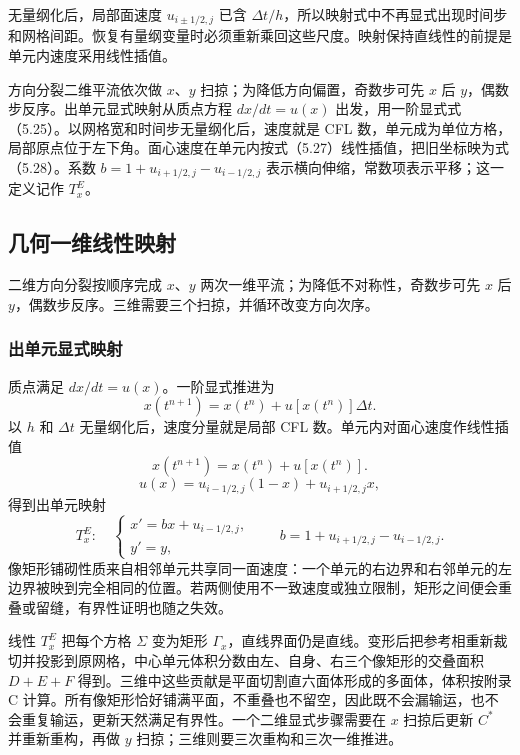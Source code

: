 \documentclass[11pt,a4paper,openany,fontset=none]{ctexbook}
\begin{document}
无量纲化后，局部面速度 $u_{i\pm1/2,j}$ 已含 $\Delta t/h$，所以映射式中不再显式出现时间步和网格间距。恢复有量纲变量时必须重新乘回这些尺度。映射保持直线性的前提是单元内速度采用线性插值。

方向分裂二维平流依次做 $x$、$y$ 扫掠；为降低方向偏置，奇数步可先 $x$ 后 $y$，偶数步反序。出单元显式映射从质点方程 $dx/dt=u(x)$ 出发，用一阶显式式（5.25）。以网格宽和时间步无量纲化后，速度就是 CFL 数，单元成为单位方格，局部原点位于左下角。面心速度在单元内按式（5.27）线性插值，把旧坐标映为式（5.28）。系数 $b=1+u_{i+1/2,j}-u_{i-1/2,j}$ 表示横向伸缩，常数项表示平移；这一定义记作 $T_x^E$。

\subsection{几何一维线性映射}

二维方向分裂按顺序完成 $x$、$y$ 两次一维平流；为降低不对称性，奇数步可先 $x$ 后 $y$，偶数步反序。三维需要三个扫掠，并循环改变方向次序。

\subsubsection{出单元显式映射}

质点满足 $dx/dt=u(x)$。一阶显式推进为
\begin{equation}
x(t^{n+1})=x(t^n)+u[x(t^n)]\Delta t.
\tag{5.25}
\end{equation}
以 $h$ 和 $\Delta t$ 无量纲化后，速度分量就是局部 CFL 数。单元内对面心速度作线性插值
\begin{equation}
x(t^{n+1})=x(t^n)+u[x(t^n)].
\tag{5.26}
\end{equation}
\begin{equation}
u(x)=u_{i-1/2,j}(1-x)+u_{i+1/2,j}x,
\tag{5.27}
\end{equation}
得到出单元映射
\begin{equation}
T_x^E:\quad
\begin{cases}
x'=bx+u_{i-1/2,j},\\
y'=y,
\end{cases}
\qquad b=1+u_{i+1/2,j}-u_{i-1/2,j}.
\tag{5.28}
\end{equation}
像矩形铺砌性质来自相邻单元共享同一面速度：一个单元的右边界和右邻单元的左边界被映到完全相同的位置。若两侧使用不一致速度或独立限制，矩形之间便会重叠或留缝，有界性证明也随之失效。

线性 $T_x^E$ 把每个方格 $\Sigma$ 变为矩形 $\Gamma_x$，直线界面仍是直线。变形后把参考相重新裁切并投影到原网格，中心单元体积分数由左、自身、右三个像矩形的交叠面积 $D+E+F$ 得到。三维中这些贡献是平面切割直六面体形成的多面体，体积按附录 C 计算。所有像矩形恰好铺满平面，不重叠也不留空，因此既不会漏输运，也不会重复输运，更新天然满足有界性。一个二维显式步骤需要在 $x$ 扫掠后更新 $C^*$ 并重新重构，再做 $y$ 扫掠；三维则要三次重构和三次一维推进。
\end{document}
